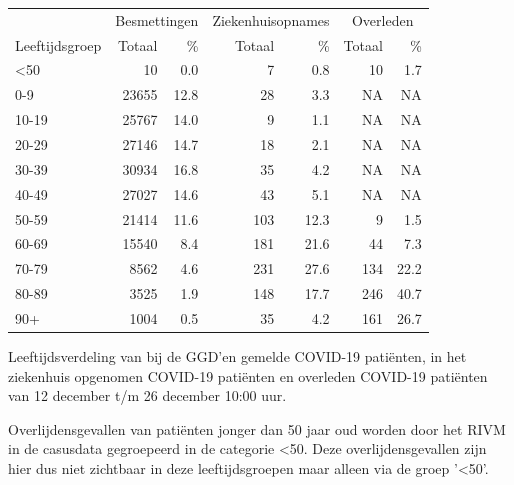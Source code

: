 \documentclass[
  english,
  man,floatsintext]{apa6}
\begin{document}
\begin{table}
\centering\begingroup\fontsize{11}{13}\selectfont

\begin{threeparttable}
\begin{tabular}{lrrrrrr}
\toprule
\multicolumn{1}{c}{ } & \multicolumn{2}{c}{Besmettingen} & \multicolumn{2}{c}{Ziekenhuisopnames} & \multicolumn{2}{c}{Overleden} \\
\cmidrule(l{3pt}r{3pt}){2-3} \cmidrule(l{3pt}r{3pt}){4-5} \cmidrule(l{3pt}r{3pt}){6-7}
Leeftijdsgroep & Totaal & \% & Totaal & \% & Totaal & \%\\
\midrule
<50 & 10 & 0.0 & 7 & 0.8 & 10 & 1.7\\
0-9 & 23655 & 12.8 & 28 & 3.3 & NA & NA\\
10-19 & 25767 & 14.0 & 9 & 1.1 & NA & NA\\
20-29 & 27146 & 14.7 & 18 & 2.1 & NA & NA\\
30-39 & 30934 & 16.8 & 35 & 4.2 & NA & NA\\
40-49 & 27027 & 14.6 & 43 & 5.1 & NA & NA\\
50-59 & 21414 & 11.6 & 103 & 12.3 & 9 & 1.5\\
60-69 & 15540 & 8.4 & 181 & 21.6 & 44 & 7.3\\
70-79 & 8562 & 4.6 & 231 & 27.6 & 134 & 22.2\\
80-89 & 3525 & 1.9 & 148 & 17.7 & 246 & 40.7\\
90+ & 1004 & 0.5 & 35 & 4.2 & 161 & 26.7\\
\bottomrule
\end{tabular}
\begin{tablenotes}
\item[1] Leeftijdsverdeling van bij de GGD’en gemelde COVID-19 patiënten, in het ziekenhuis opgenomen COVID-19 patiënten en overleden COVID-19 patiënten van 12 december t/m 26 december 10:00 uur.
\item[2] Overlijdensgevallen van patiënten jonger dan 50 jaar oud worden door het RIVM in de casusdata gegroepeerd in de categorie <50. Deze overlijdensgevallen zijn hier dus niet zichtbaar in deze leeftijdsgroepen maar alleen via de groep '<50'.
\end{tablenotes}
\end{threeparttable}
\endgroup{}
\end{table}

\newpage
\end{document}
